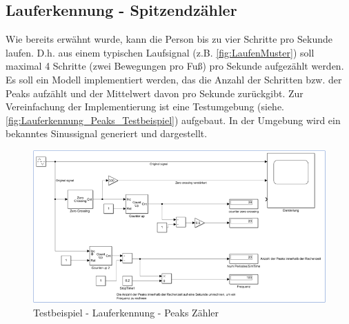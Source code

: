 \subsection{Lauferkennung - Spitzendzähler} \label{abs:PeaksAufzaehlen}

Wie bereits erwähnt wurde, kann die Person bis zu vier Schritte pro Sekunde laufen. D.h. aus einem typischen Laufsignal (z.B. \autoref{fig:LaufenMuster}) soll maximal 4 Schritte (zwei Bewegungen pro Fuß) pro Sekunde aufgezählt werden.
Es soll ein Modell implementiert werden, das die Anzahl der Schritten bzw. der Peaks aufzählt und der Mittelwert davon pro Sekunde zurückgibt. Zur Vereinfachung der Implementierung ist eine Testumgebung (siehe. \autoref{fig:Lauferkennung_Peaks_Testbeispiel}) aufgebaut. In der Umgebung wird ein bekanntes Sinussignal generiert und dargestellt.
\begin{figure}[H]
	\centering
	\includegraphics[width=\linewidth]{Bilder/Lauferkennung_Peaks_Testbeispiel.png}
	\caption{Testbeispiel - Lauferkennung - Peaks Zähler}
	\label{fig:Lauferkennung_Peaks_Testbeispiel}
\end{figure}

